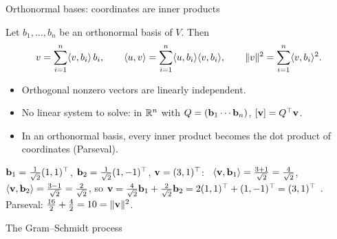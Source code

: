 \documentclass[aspectratio=1610,11pt]{beamer}
\begin{document}
\begin{frame}{Orthonormal bases: coordinates are inner products}
    \begin{proposition}
        Let $b_1, \ldots, b_n$ be an orthonormal basis of $V$. Then
        \[v = \sum_{i=1}^n \langle v, b_i \rangle\, b_i, \qquad \langle u, v \rangle = \sum_{i=1}^n \langle u, b_i \rangle\langle v, b_i \rangle, \qquad \lVert v \rVert^2 = \sum_{i=1}^n \langle v, b_i \rangle^2.\]
    \end{proposition}
    \small
    \begin{itemize}
        \item Orthogonal nonzero vectors are linearly independent.
        \item No linear system to solve: in $\mathbb{R}^n$ with $Q = (\mathbf{b}_1 \cdots \mathbf{b}_n)$, $[\mathbf{v}] = Q^\top\mathbf{v}$.
        \item In an orthonormal basis, every inner product becomes the dot product of coordinates (Parseval).
    \end{itemize}
    \begin{example}
        $\mathbf{b}_1 = \frac{1}{\sqrt{2}}(1, 1)^\top$, $\mathbf{b}_2 = \frac{1}{\sqrt{2}}(1, -1)^\top$, $\mathbf{v} = (3, 1)^\top$: \ $\langle \mathbf{v}, \mathbf{b}_1 \rangle = \frac{3 + 1}{\sqrt2} = \frac{4}{\sqrt2}$, $\langle \mathbf{v}, \mathbf{b}_2 \rangle = \frac{3 - 1}{\sqrt2} = \frac{2}{\sqrt2}$, so $\mathbf{v} = \frac{4}{\sqrt{2}}\mathbf{b}_1 + \frac{2}{\sqrt{2}}\mathbf{b}_2 = 2(1, 1)^\top + (1, -1)^\top = (3, 1)^\top$ \checkmark. Parseval: $\frac{16}{2} + \frac{4}{2} = 10 = \lVert \mathbf{v} \rVert^2$.
    \end{example}
\end{frame}

\begin{frame}{The Gram--Schmidt process}
\end{frame}
\end{document}
